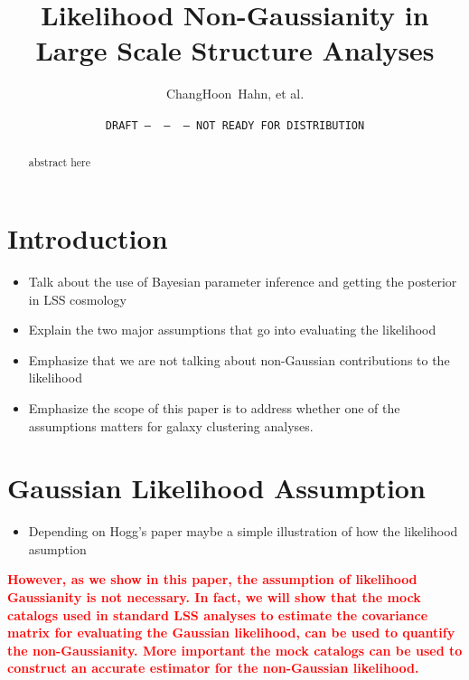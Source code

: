 \documentclass[12pt, letterpaper, preprint]{aastex}
\newcommand{\todo}[1]{{\bf \textcolor{red}{#1}}}
\begin{document}
\sloppy\sloppypar\frenchspacing 

\title{Likelihood Non-Gaussianity in Large Scale Structure Analyses}
\date{\texttt{DRAFT~---~\githash~---~\gitdate~---~NOT READY FOR DISTRIBUTION}}
\author{ChangHoon~Hahn, et al.} %

\begin{abstract}
    abstract here 
\end{abstract}


\section{Introduction}
\begin{itemize}
    \item Talk about the use of Bayesian parameter inference and getting the posterior in LSS cosmology 
    \item Explain the two major assumptions that go into evaluating the likelihood
    \item Emphasize that we are not talking about non-Gaussian contributions to the likelihood
    \item Emphasize the scope of this paper is to address whether one of the assumptions matters for 
        galaxy clustering analyses. 
\end{itemize}

\section{Gaussian Likelihood Assumption} \label{sec:gaussass} 
\begin{itemize}
    \item Depending on Hogg's paper maybe a simple illustration of how the likelihood asumption 
\end{itemize}

\todo{However, as we show in this paper, the assumption of likelihood 
Gaussianity is not necessary. In fact, we will show that the mock catalogs 
used in standard LSS analyses to estimate the covariance matrix for 
evaluating the Gaussian likelihood, can be used to quantify the non-Gaussianity. 
More important the mock catalogs can be used to construct an accurate 
estimator for the non-Gaussian likelihood.} 
\end{document}
